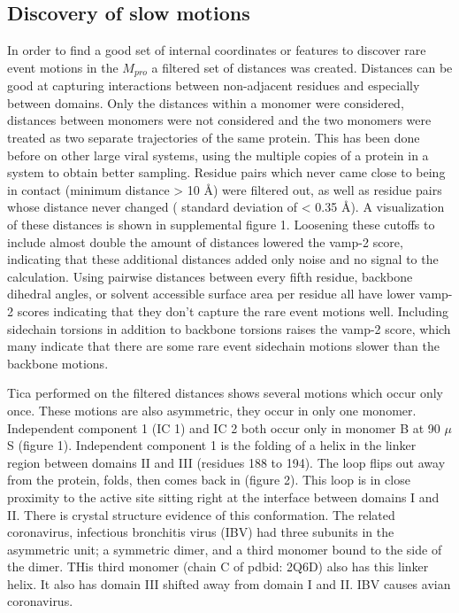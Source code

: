 \documentclass{biophys-new}
\begin{document}
\subsection*{Discovery of slow motions}

In order to find a good set of internal coordinates or features to discover rare event motions in the $M_{pro}$ a filtered set of distances was created. Distances can be good at capturing interactions between non-adjacent residues and especially between domains. Only the distances within a monomer were considered, distances between monomers were not considered and the two monomers were treated as two separate trajectories of the same protein. This has been done before on other large viral systems, using the multiple copies of a protein in a system to obtain better sampling.\cite{perilla2017physical, hadden2018all} Residue pairs which never came close to being in contact (minimum distance > 10 Å) were filtered out, as well as residue pairs whose distance never changed ( standard deviation of < 0.35 Å). A visualization of these distances is shown in supplemental figure 1. Loosening these cutoffs to include almost double the amount of distances lowered the vamp-2 score, indicating that these additional distances added only noise and no signal to the calculation. Using pairwise distances between every fifth residue, backbone dihedral angles, or solvent accessible surface area per residue all have lower vamp-2 scores indicating that they don't capture the rare event motions well. Including sidechain torsions in addition to backbone torsions raises the vamp-2 score, which many indicate that there are some rare event sidechain motions slower than the backbone motions.

Tica performed on the filtered distances shows several motions which occur only once. These motions are also asymmetric, they occur in only one monomer. Independent component 1 (IC 1) and IC 2 both occur only in monomer B at 90 $\mu$S (figure 1). Independent component 1 is the folding of a helix in the linker region between domains II and III (residues 188 to 194). The loop flips out away from the protein, folds, then comes back in (figure 2). This loop is in close proximity to the active site sitting right at the interface between domains I and II. There is crystal structure evidence of this conformation. The related coronavirus, infectious bronchitis virus (IBV) had three subunits in the asymmetric unit; a symmetric dimer, and a third monomer bound to the side of the dimer. THis third monomer (chain C of pdbid: 2Q6D) also has this linker helix. It also has domain III shifted away from domain I and II. IBV causes avian coronavirus.
\end{document}
